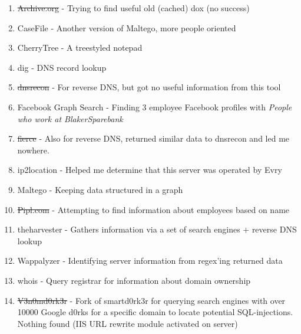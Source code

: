 \begin{enumerate}
	\item \sout{Archive.org} - Trying to find useful old (cached) dox (no success)
	\item CaseFile - Another version of Maltego, more people oriented
	\item CherryTree - A treestyled notepad
	\item dig		- DNS record lookup
	\item \sout{dnsrecon} 	- For reverse DNS, but got no useful information from this tool
	\item Facebook Graph Search - Finding 3 employee Facebook profiles with \textit{People who work at BlakerSparebank}
	\item \sout{fierce}	- Also for reverse DNS, returned similar data to dnsrecon and led me nowhere.
	\item ip2location - Helped me determine that this server was operated by Evry
	\item Maltego 	- Keeping data structured in a graph
	\item \sout{Pipl.com} - Attempting to find information about employees based on name
	\item theharvester - Gathers information via a set of search engines + reverse DNS lookup
	\item Wappalyzer - Identifying server information from regex'ing returned data
	\item whois		- Query registrar for information about domain ownership
	\item \sout{V3n0md0rk3r} - Fork of smartd0rk3r for querying search engines with over 10000 Google d0rks for a specific domain to locate potential SQL-injections. Nothing found (IIS URL rewrite module activated on server)
\end{enumerate}